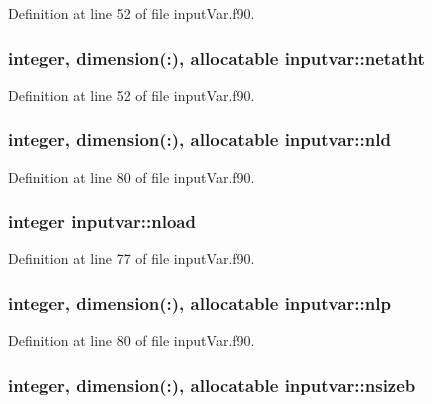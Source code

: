 Definition at line 52 of file input\-Var.\-f90.

\hypertarget{classinputvar_acebcf3d64f116183dd364e920288729f}{
\subsubsection[{netatht}]{\setlength{\rightskip}{0pt plus 5cm}integer, dimension(\-:), allocatable inputvar\-::netatht}}\label{classinputvar_acebcf3d64f116183dd364e920288729f}


Definition at line 52 of file input\-Var.\-f90.

\hypertarget{classinputvar_a8c5a23a5a519fb86c67fc1465aef0e33}{
\subsubsection[{nld}]{\setlength{\rightskip}{0pt plus 5cm}integer, dimension(\-:), allocatable inputvar\-::nld}}\label{classinputvar_a8c5a23a5a519fb86c67fc1465aef0e33}


Definition at line 80 of file input\-Var.\-f90.

\hypertarget{classinputvar_ac924c0b7af6a3dbae99f1a60dc9242ab}{
\subsubsection[{nload}]{\setlength{\rightskip}{0pt plus 5cm}integer inputvar\-::nload}}\label{classinputvar_ac924c0b7af6a3dbae99f1a60dc9242ab}


Definition at line 77 of file input\-Var.\-f90.

\hypertarget{classinputvar_a3f2f71983b35bd63596385392671f89d}{
\subsubsection[{nlp}]{\setlength{\rightskip}{0pt plus 5cm}integer, dimension(\-:), allocatable inputvar\-::nlp}}\label{classinputvar_a3f2f71983b35bd63596385392671f89d}


Definition at line 80 of file input\-Var.\-f90.

\hypertarget{classinputvar_ad0bd77a901e4e300f887dc0682a4884d}{
\subsubsection[{nsizeb}]{\setlength{\rightskip}{0pt plus 5cm}integer, dimension(\-:), allocatable inputvar\-::nsizeb}}\label{classinputvar_ad0bd77a901e4e300f887dc0682a4884d}


